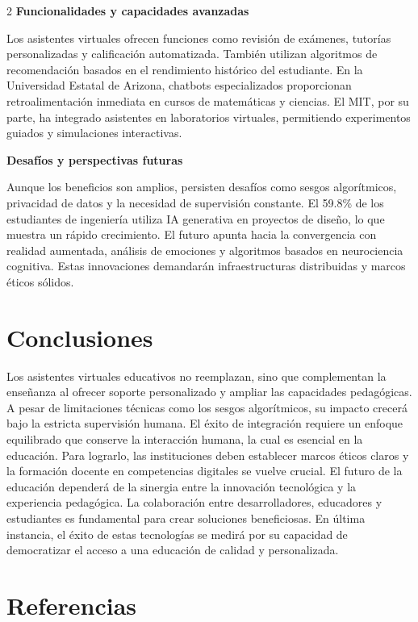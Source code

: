\documentclass[12pt,spanish,Letterpaper,openany]{book}
\begin{document}
\begin {multicols}{2}
\textbf{Funcionalidades y capacidades avanzadas}

Los asistentes virtuales ofrecen funciones como revisión de exámenes, tutorías personalizadas y calificación automatizada. También utilizan algoritmos de recomendación basados en el rendimiento histórico del estudiante. En la Universidad Estatal de Arizona, chatbots especializados proporcionan retroalimentación inmediata en cursos de matemáticas y ciencias. El MIT, por su parte, ha integrado asistentes en laboratorios virtuales, permitiendo experimentos guiados y simulaciones interactivas.

\bigskip

\textbf{Desafíos y perspectivas futuras}

Aunque los beneficios son amplios, persisten desafíos como sesgos algorítmicos, privacidad de datos y la necesidad de supervisión constante. El 59.8\% de los estudiantes de ingeniería utiliza IA generativa en proyectos de diseño, lo que muestra un rápido crecimiento. El futuro apunta hacia la convergencia con realidad aumentada, análisis de emociones y algoritmos basados en neurociencia cognitiva. Estas innovaciones demandarán infraestructuras distribuidas y marcos éticos sólidos.

\bigskip
\bigskip

\section{Conclusiones}\label{conclusiones-1}

Los asistentes virtuales educativos no reemplazan, sino que complementan la enseñanza al ofrecer soporte personalizado y ampliar las capacidades pedagógicas. A pesar de limitaciones técnicas como los sesgos algorítmicos, su impacto crecerá bajo la estricta supervisión humana. El éxito de integración requiere un enfoque equilibrado que conserve la interacción humana, la cual es esencial en la educación. Para lograrlo, las instituciones deben establecer marcos éticos claros y la formación docente en competencias digitales se vuelve crucial. El futuro de la educación dependerá de la sinergia entre la innovación tecnológica y la experiencia pedagógica. La colaboración entre desarrolladores, educadores y estudiantes es fundamental para crear soluciones beneficiosas. En última instancia, el éxito de estas tecnologías se medirá por su capacidad de democratizar el acceso a una educación de calidad y personalizada.

\section{Referencias}\label{referencias-1}


\end{multicols}
\end{document}
